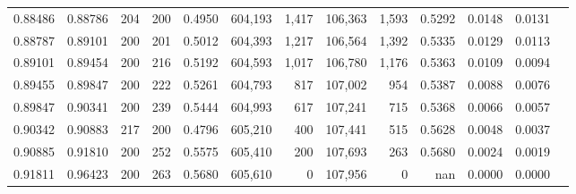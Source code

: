 \begin{tabular}{rrrrrrrrrrrrr}
0.88486 & 0.88786 &   204 & 200 &                                     0.4950 & 604,193 &   1,417 & 106,363 &   1,593 & 0.5292 & 0.0148 & 0.0131 \\
0.88787 & 0.89101 &   200 & 201 &                                     0.5012 & 604,393 &   1,217 & 106,564 &   1,392 & 0.5335 & 0.0129 & 0.0113 \\
0.89101 & 0.89454 &   200 & 216 &                                     0.5192 & 604,593 &   1,017 & 106,780 &   1,176 & 0.5363 & 0.0109 & 0.0094 \\
0.89455 & 0.89847 &   200 & 222 &                                     0.5261 & 604,793 &     817 & 107,002 &     954 & 0.5387 & 0.0088 & 0.0076 \\
0.89847 & 0.90341 &   200 & 239 &                                     0.5444 & 604,993 &     617 & 107,241 &     715 & 0.5368 & 0.0066 & 0.0057 \\
0.90342 & 0.90883 &   217 & 200 &                                     0.4796 & 605,210 &     400 & 107,441 &     515 & 0.5628 & 0.0048 & 0.0037 \\
0.90885 & 0.91810 &   200 & 252 &                                     0.5575 & 605,410 &     200 & 107,693 &     263 & 0.5680 & 0.0024 & 0.0019 \\
0.91811 & 0.96423 &   200 & 263 &                                     0.5680 & 605,610 &       0 & 107,956 &       0 &    nan & 0.0000 & 0.0000 \\
\bottomrule
\end{tabular}
